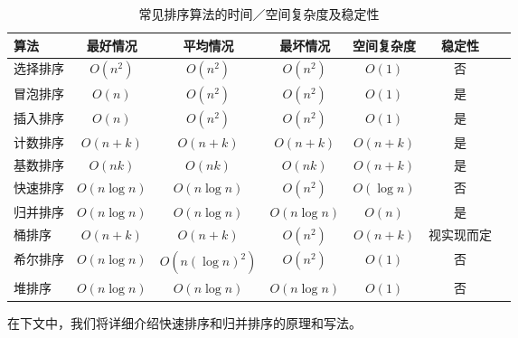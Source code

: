 \documentclass{beamer}
\begin{document}
\begin{table}[htbp]
  \centering
  \caption{常见排序算法的时间／空间复杂度及稳定性}
  \label{tab:sort_complexities}
  \footnotesize
  \begin{adjustbox}{max width=\textwidth}
    \begin{tabular}{lcccccc}
      \toprule
      算法     & 最好情况       & 平均情况       & 最坏情况       & 空间复杂度    & 稳定性 \\ 
      \midrule
      选择排序 & $O(n^2)$     & $O(n^2)$     & $O(n^2)$     & $O(1)$     & 否    \\
      冒泡排序 & $O(n)$       & $O(n^2)$     & $O(n^2)$     & $O(1)$     & 是    \\
      插入排序 & $O(n)$       & $O(n^2)$     & $O(n^2)$     & $O(1)$     & 是    \\
      计数排序 & $O(n+k)$     & $O(n+k)$     & $O(n+k)$     & $O(n+k)$   & 是    \\
      基数排序 & $O(nk)$      & $O(nk)$      & $O(nk)$      & $O(n+k)$   & 是    \\
      快速排序 & $O(n\log n)$ & $O(n\log n)$ & $O(n^2)$     & $O(\log n)$& 否    \\
      归并排序 & $O(n\log n)$ & $O(n\log n)$ & $O(n\log n)$ & $O(n)$     & 是    \\
      桶排序   & $O(n+k)$     & $O(n+k)$     & $O(n^2)$     & $O(n+k)$   & 视实现而定 \\
      希尔排序 & $O(n\log n)$ & $O(n(\log n)^2)$ & $O(n^2)$ & $O(1)$  & 否    \\
      堆排序   & $O(n\log n)$ & $O(n\log n)$ & $O(n\log n)$ & $O(1)$     & 否    \\
      \bottomrule
    \end{tabular}
  \end{adjustbox}
  在下文中，我们将详细介绍快速排序和归并排序的原理和写法。
\end{table}
\end{document}
